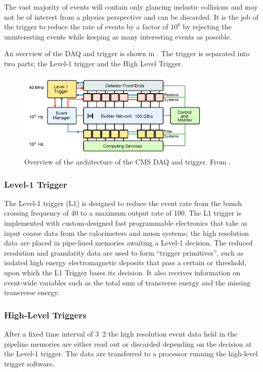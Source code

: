 The vast majority of events will contain only glancing inelastic collisions and
may not be of interest from a physics perspective and can be discarded.  It is
the job of the trigger to reduce the rate of events by a factor of $10^6$ by
rejecting the uninteresting events while keeping as many interesting events as
possible.

An overview of the {DAQ} and trigger is shown in .
The trigger is separated into two parts; the Level-1 trigger and the High
Level Trigger.\cite{chatrchyan2008cms}

\begin{figure}[htbp]
  \centering
  \includegraphics[width=0.85\textwidth]{CMSDAQ}
  \caption[Overview of the architecture of the CMS DAQ and trigger.] {Overview
of the architecture of the CMS DAQ and trigger. From \label{fig:CMSDAQ}
\cite{chatrchyan2008cms}.}
\end{figure}

\subsubsection{Level-1 Trigger}

The Level-1 trigger (L1) is designed to reduce the event rate from the bunch
crossing frequency of \unit{40}{\mega\hertz} to a maximum output rate of
\unit{100}{\kilo\hertz}.  The L1 trigger is implemented with custom-designed
fast programmable electronics that take as input coarse data from the
calorimeters and muon systems; the high resolution data are placed in pipe-lined
memories awaiting a Level-1 decision. The reduced resolution and granularity data are used to form ``trigger
primitives'', such as isolated high energy electromagnetic deposits that pass a
certain \PT or \ET threshold, upon which the L1 Trigger bases its decision. It
also receives information on event-wide variables such as the total sum of
transverse energy and the missing transverse energy.

\subsubsection{High-Level Triggers}
After a fixed time interval of \unit{3.2}{\micro\second} the high resolution
event data held in the pipeline memories are either read out or discarded
depending on the decision at the Level-1 trigger.  The data are transferred to a
processor running the high-level trigger software.

